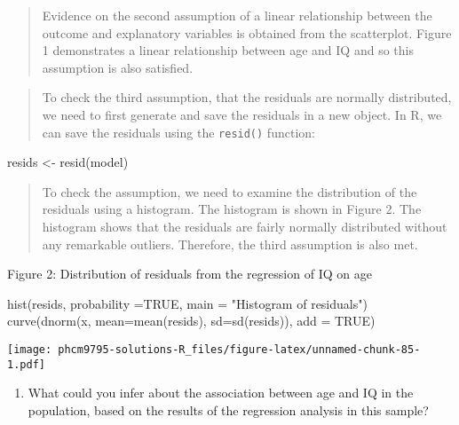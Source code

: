 \documentclass[
]{memoir}
\newenvironment{Shaded}{\begin{snugshade}}{\end{snugshade}}
\newcommand{\AttributeTok}[1]{\textcolor[rgb]{0.77,0.63,0.00}{#1}}
\newcommand{\ConstantTok}[1]{\textcolor[rgb]{0.00,0.00,0.00}{#1}}
\newcommand{\FunctionTok}[1]{\textcolor[rgb]{0.00,0.00,0.00}{#1}}
\newcommand{\NormalTok}[1]{#1}
\newcommand{\OtherTok}[1]{\textcolor[rgb]{0.56,0.35,0.01}{#1}}
\newcommand{\StringTok}[1]{\textcolor[rgb]{0.31,0.60,0.02}{#1}}
\providecommand{\tightlist}{%
  \setlength{\itemsep}{0pt}\setlength{\parskip}{0pt}}
\begin{document}
\begin{quote}
Evidence on the second assumption of a linear relationship between the outcome and explanatory variables is obtained from the scatterplot. Figure 1 demonstrates a linear relationship between age and IQ and so this assumption is also satisfied.
\end{quote}

\begin{quote}
To check the third assumption, that the residuals are normally distributed, we need to first generate and save the residuals in a new object. In R, we can save the residuals using the \texttt{resid()} function:
\end{quote}

\begin{Shaded}
\begin{Highlighting}[]
\NormalTok{resids }\OtherTok{\textless{}{-}} \FunctionTok{resid}\NormalTok{(model)}
\end{Highlighting}
\end{Shaded}

\begin{quote}
To check the assumption, we need to examine the distribution of the residuals using a histogram. The histogram is shown in Figure 2. The histogram shows that the residuals are fairly normally distributed without any remarkable outliers. Therefore, the third assumption is also met.
\end{quote}

Figure 2: Distribution of residuals from the regression of IQ on age

\begin{Shaded}
\begin{Highlighting}[]
\FunctionTok{hist}\NormalTok{(resids, }\AttributeTok{probability =}\ConstantTok{TRUE}\NormalTok{,}
     \AttributeTok{main =} \StringTok{"Histogram of residuals"}\NormalTok{)}
\FunctionTok{curve}\NormalTok{(}\FunctionTok{dnorm}\NormalTok{(x,}
            \AttributeTok{mean=}\FunctionTok{mean}\NormalTok{(resids),}
            \AttributeTok{sd=}\FunctionTok{sd}\NormalTok{(resids)), }\AttributeTok{add =} \ConstantTok{TRUE}\NormalTok{)}
\end{Highlighting}
\end{Shaded}

\texttt{[image: phcm9795-solutions-R\_files/figure-latex/unnamed-chunk-85-1.pdf]}

\begin{enumerate}
\def\labelenumi{\alph{enumi})}
\setcounter{enumi}{4}
\tightlist
\item
  What could you infer about the association between age and IQ in the population, based on the results of the regression analysis in this sample?
\end{enumerate}
\end{document}
